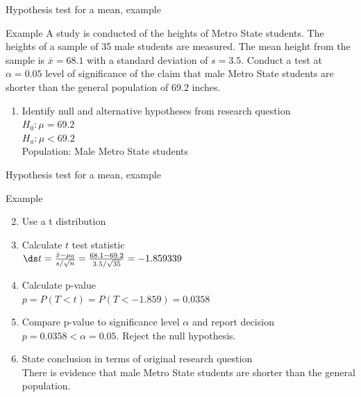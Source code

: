 \documentclass[xcolor=table, aspectratio=169, bigger, handout]{beamer}
\begin{document}
\begin{frame}{Hypothesis test for a mean, example}
\begin{exampleblock}{Example}
A study is conducted of the heights of Metro State students. The heights of a sample of 35 male students are measured. The mean height from the sample is $\bar x = 68.1$ with a standard deviation of $s=3.5$. Conduct a test at $\alpha=0.05$ level of significance of the claim that male Metro State students are shorter than the general population of 69.2 inches.
\begin{enumerate}
\pause\item Identify null and alternative hypotheses from research question\\
\pause$H_0: \mu = 69.2$\\
$H_a: \mu < 69.2$\\
Population: Male Metro State students
\end{enumerate}
\end{exampleblock}
\end{frame}

\begin{frame}{Hypothesis test for a mean, example}
\begin{exampleblock}{Example}
\begin{enumerate}
\setcounter{enumi}{1}

\item Use a t distribution
\pause\item Calculate $t$ test statistic\\
\pause\smallskip$\ds t=\frac{\bar x - \mu_0}{s / \sqrt{n}} = \frac{68.1 - 69.2}{3.5 / \sqrt{35}} = -1.859339$
\pause\item Calculate p-value\\
\pause$p = P(T < t) = P(T < -1.859) = 0.0358$
\pause\item Compare p-value to significance level $\alpha$ and report decision\\
\pause$p = 0.0358 < \alpha = 0.05$. Reject the null hypothesis.
\pause\item State conclusion in terms of original research question\\
\pause There is evidence that male Metro State students are shorter than the general population.
\end{enumerate}

\end{exampleblock}
\end{frame}
\end{document}
